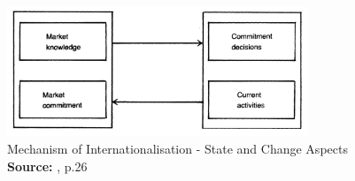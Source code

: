 \documentclass[11pt,a4paper]{article}
\newcommand*{\captionsource}[2]{%
  \caption[{#1}]{%
    #1%
    \\\hspace{\linewidth}%
    \textbf{Source:} #2%
  }%
}
\begin{document}
\begin{figure}[H]
	\centering
  \includegraphics[width=90mm]{figures/fig4_uppsala_core_concepts}
  \vspace{5mm}
    \captionsetup{justification=centering,margin=2cm}
      \captionsource{Mechanism of Internationalisation - State and Change Aspects}{\cite{johansonInternationalizationProcessFirm1977}, p.26}
	\label{fig:uppsala_core_concepts}
\end{figure}
\end{document}
